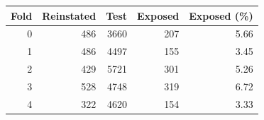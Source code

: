 \begin{tabular}{rrrrr}
\hline
Fold & Reinstated & Test & Exposed & Exposed (\%) \\
\hline
0 & 486 & 3660 & 207 & 5.66 \\
1 & 486 & 4497 & 155 & 3.45 \\
2 & 429 & 5721 & 301 & 5.26 \\
3 & 528 & 4748 & 319 & 6.72 \\
4 & 322 & 4620 & 154 & 3.33 \\
\hline
\end{tabular}
